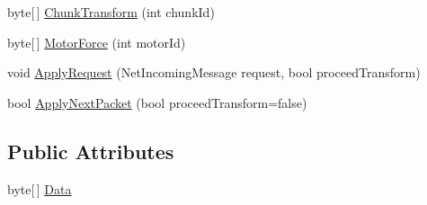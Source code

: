 \begin{DoxyCompactItemize}
\item 
byte\mbox{[}$\,$\mbox{]} \hyperlink{classgearit_1_1src_1_1_network_1_1_in_game_packet_manager_ad2d4b5baad875314d89d72fc3a7ff539}{Chunk\+Transform} (int chunk\+Id)
\item 
byte\mbox{[}$\,$\mbox{]} \hyperlink{classgearit_1_1src_1_1_network_1_1_in_game_packet_manager_a5e406a1834036fe2784cf677150ea0ca}{Motor\+Force} (int motor\+Id)
\item 
void \hyperlink{classgearit_1_1src_1_1_network_1_1_in_game_packet_manager_a61cfea003d8d2105e9fdfbdce4c9e19d}{Apply\+Request} (Net\+Incoming\+Message request, bool proceed\+Transform)
\item 
bool \hyperlink{classgearit_1_1src_1_1_network_1_1_in_game_packet_manager_aa00126718f5f764fbcf68700ce3bafa3}{Apply\+Next\+Packet} (bool proceed\+Transform=false)
\end{DoxyCompactItemize}
\subsection*{Public Attributes}
\begin{DoxyCompactItemize}
\item 
byte\mbox{[}$\,$\mbox{]} \hyperlink{classgearit_1_1src_1_1_network_1_1_in_game_packet_manager_a5c9c57ce847696e1acfb9c33d76f4b1f}{Data}
\end{DoxyCompactItemize}


